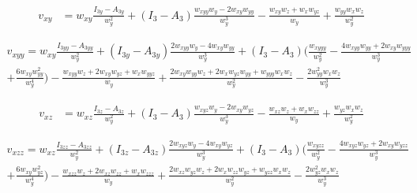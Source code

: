 \documentclass[12pt,a4paper]{article}
\begin{document}
  \begin{align}
	v_{xy} &= w_{xy} \frac{I_{3y} - A_{3y}}{w_y^2} + \left( I_3 - A_3 \right) \frac{w_{xyy} w_y - 2 w_{xy} w_{yy}}{w_y^3} - \frac{w_{xy} w_z + w_x w_{yz}}{w_y} + \frac{w_{yy} w_x w_z}{w_y^2}
  \end{align}

  \begin{multline}
    v_{xyy} = w_{xy} \frac{I_{3yy} - A_{3yy}}{w_y^2} + \left( I_{3y} - A_{3y} \right) \frac{2 w_{xyy} w_y - 4 w_{xy} w_{yy}}{w_y^3}
	    + \left( I_3 - A_3 \right) \biggl( \frac{w_{xyyy}}{w_y^2} - \frac{4 w_{xyy} w_{yy} + 2 w_{xy} w_{yyy}}{w_y^3} \\
		+ \frac{6 w_{xy} w_{yy}^2}{w_y^4} \biggr)
    	- \frac{w_{xyy} w_z + 2 w_{xy} w_{yz} + w_x w_{yyz}}{w_y} + \frac{2 w_{xy} w_{yy} w_z + 2 w_x w_{yz} w_{yy} + w_{yyy} w_x w_z}{w_y^2} - \frac{2 w_{yy}^2 w_x w_z}{w_y^3}
  \end{multline}

  \begin{align}
	v_{xz} &= w_{xz} \frac{I_{3z} - A_{3z}}{w_y^2} + \left( I_3 - A_3 \right) \frac{w_{xyz} w_y - 2 w_{xy} w_{yz}}{w_y^3} - \frac{w_{xz} w_z + w_x w_{zz}}{w_y} + \frac{w_{yz} w_x w_z}{w_y^2}
  \end{align}

  \begin{multline}
    v_{xzz} = w_{xz} \frac{I_{3zz} - A_{3zz}}{w_y^2} + \left( I_{3z} - A_{3z} \right) \frac{2 w_{xyz} w_y - 4 w_{xy} w_{yz}}{w_y^3}
	    + \left( I_3 - A_3 \right) \biggl( \frac{w_{xyzz}}{w_y^2} - \frac{4 w_{xyz} w_{yz} + 2 w_{xy} w_{yzz}}{w_y^3} \\
		+ \frac{6 w_{xy} w_{yz}^2}{w_y^4} \biggr)
    	- \frac{w_{xzz} w_z + 2 w_{xz} w_{zz} + w_x w_{zzz}}{w_y} + \frac{2 w_{xz} w_{yz} w_z + 2 w_x w_{zz} w_{yz} + w_{yzz} w_x w_z}{w_y^2} - \frac{2 w_{yz}^2 w_x w_z}{w_y^3}
  \end{multline}
\end{document}
